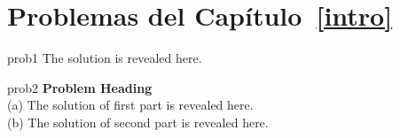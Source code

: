 

\section*{Problemas del Capítulo~\ref{intro}}

\begin{sol}{prob1}
The solution is revealed here.
\end{sol}


\begin{sol}{prob2}
\textbf{Problem Heading}\\
(a) The solution of first part is revealed here.\\
(b) The solution of second part is revealed here.
\end{sol}

